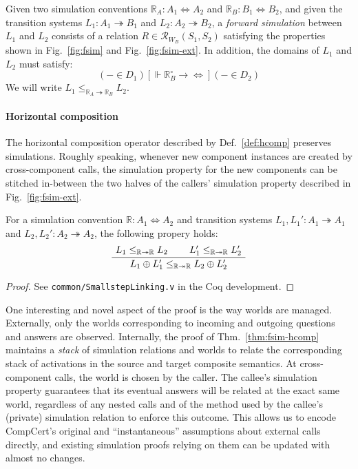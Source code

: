 \documentclass[acmsmall,screen,review,anonymous]{acmart}
\newcommand{\ifr}[1]{\mathrel{[{#1}]}}
\newcommand{\que}{\circ}
\begin{document}
\begin{definition} \label{def:fsim} %
Given
two simulation conventions
$\mathbb{R}_A : A_1 \Leftrightarrow A_2$ and
$\mathbb{R}_B : B_1 \Leftrightarrow B_2$,
and given
the transition systems
$L_1 : A_1 \twoheadrightarrow B_1$ and
$L_2 : A_2 \twoheadrightarrow B_2$,
a \emph{forward simulation} between $L_1$ and $L_2$
consists of a relation
$R \in \mathcal{R}_{W_B}(S_1, S_2)$
satisfying the properties shown in
Fig.~\ref{fig:fsim} and Fig.~\ref{fig:fsim-ext}.
In addition, the domains of $L_1$ and $L_2$
must satisfy:
\[
  ({-} \in D_1)
  \ifr{\Vdash \mathbb{R}_B^\que \rightarrow {\Leftrightarrow}}
  ({-} \in D_2)
\]
We will write $L_1 \le_{\mathbb{R}_A \twoheadrightarrow \mathbb{R}_B} L_2$.
\end{definition}


\paragraph{Horizontal composition} %

The horizontal composition operator
described by Def.~\ref{def:hcomp}
preserves simulations.
Roughly speaking,
whenever new component instances are created
by cross-component calls,
the simulation property for the new components
can be stitched in-between
the two halves of the callers' simulation property
described in Fig.~\ref{fig:fsim-ext}.

\begin{theorem} \label{thm:fsim-hcomp} %
For a simulation convention
$\mathbb{R} : A_1 \Leftrightarrow A_2$
and transition systems
$L_1, L_1' : A_1 \twoheadrightarrow A_1$ and
$L_2, L_2' : A_2 \twoheadrightarrow A_2$,
the following propery holds:
\[
    \AxiomC{$L_1 \le_{\mathbb{R} \twoheadrightarrow \mathbb{R}} L_2$}
    \AxiomC{$L_1' \le_{\mathbb{R} \twoheadrightarrow \mathbb{R}} L_2'$}
    \BinaryInfC{$L_1 \oplus L_1'
      \le_{\mathbb{R} \twoheadrightarrow \mathbb{R}}
      L_2 \oplus L_2'$}
    \DisplayProof
\]
\begin{proof}
See \texttt{common/SmallstepLinking.v}
in the Coq development.
\end{proof}
\end{theorem}

One interesting and novel aspect of the proof
is the way worlds are managed.
Externally,
only the worlds corresponding to incoming and outgoing
questions and answers are observed.
Internally,
the proof of Thm.~\ref{thm:fsim-hcomp}
maintains a \emph{stack} of
simulation relations and worlds
to relate the corresponding stack of activations
in the source and target composite semantics.
At cross-component calls,
the world is chosen by the caller.
The callee's simulation property
guarantees that its eventual answers
will be related at the exact same world,
regardless of any nested calls and
of the method used by the callee's (private) simulation relation
to enforce this outcome.
This allows us to encode CompCert's original and
``instantaneous'' assumptions about external calls directly,
and existing simulation proofs relying on them
can be updated with almost no changes.
\end{document}
